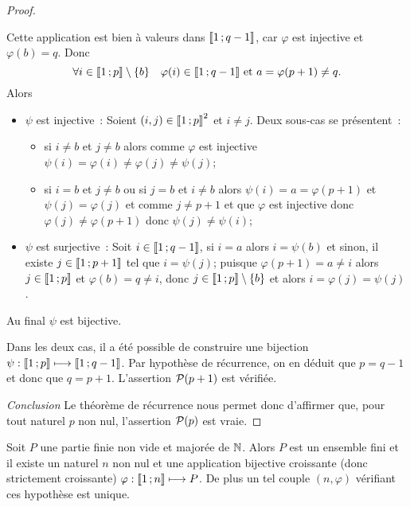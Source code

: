 \begin{proof}
\begin{itemize}
  Cette application est bien à valeurs dans \(\intervalleentier{1}{q-1}\), car \(\varphi\) est injective et \(\varphi(b)=q\). Donc
  \begin{equation}
    \forall i \in \intervalleentier{1}{p} \setminus \{b\} \quad \varphi(i) \in \intervalleentier{1}{q-1} \text{~et~} a=\varphi(p+1) \neq q.
  \end{equation}
  Alors
  \begin{itemize}
  \item \(\psi\) est injective~: Soient \((i,j) \in \intervalleentier{1}{p}^2\) et \(i \neq j\). Deux sous-cas se présentent~:
    \begin{itemize}
    \item si \(i \neq b\) et \(j \neq b\) alors comme \(\varphi\) est injective \(\psi(i)=\varphi(i) \neq \varphi(j) \neq \psi(j)\);
    \item si \(i = b\) et \(j \neq b\) ou si \(j=b\) et \(i \neq b\) alors \(\psi(i)=a=\varphi(p+1)\) et \(\psi(j)=\varphi(j)\) et comme \(j \neq p+1\) et que \(\varphi\) est injective donc \(\varphi(j) \neq \varphi(p+1)\) donc \(\psi(j) \neq \psi(i)\);
    \end{itemize}
  \item \(\psi\) est surjective~: Soit \(i \in \intervalleentier{1}{q-1}\), si \(i=a\) alors \(i=\psi(b)\) et sinon, il existe \(j \in \intervalleentier{1}{p+1}\) tel que \(i=\psi(j)\); puisque \(\varphi(p+1)=a \neq i\) alors \(j \in \intervalleentier{1}{p}\) et \(\varphi(b)=q \neq i\), donc \(j \in \intervalleentier{1}{p} \setminus \{b\}\) et alors \(i=\varphi(j)=\psi(j)\).
  \end{itemize}
  Au final \(\psi\) est bijective.
\end{itemize}

Dans les deux cas, il a été possible de construire une bijection \(\psi : \intervalleentier{1}{p} \longmapsto \intervalleentier{1}{q-1}\). Par hypothèse de récurrence, on en déduit que \(p=q-1\) et donc que \(q=p+1\). L'assertion \(\P(p+1)\) est vérifiée.

\emph{Conclusion} Le théorème de récurrence nous permet donc d'affirmer que, pour tout naturel \(p\) non nul, l'assertion \(\P(p)\) est vraie.
\end{proof}

\begin{theo}
  Soit \(P\) une partie finie non vide et majorée de \(\N\). Alors \(P\) est un ensemble fini et il existe un naturel \(n\) non nul et une application bijective croissante (donc strictement croissante) \(\varphi : \intervalleentier{1}{n} \longmapsto P\). De plus un tel couple \((n,  \varphi)\) vérifiant ces hypothèse est unique.
\end{theo}

